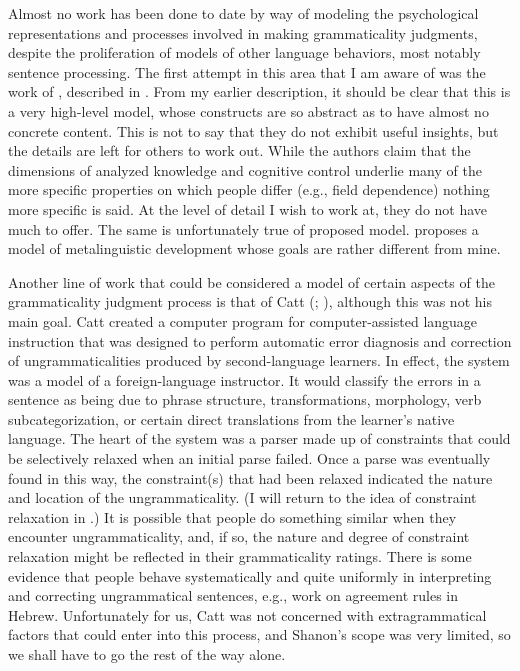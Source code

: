 Almost no work has been done to date by way of modeling the psychological representations and processes involved in making grammaticality judgments, despite the proliferation of models of other language behaviors, most notably sentence processing. The first attempt in this area that I am aware of was the work of \citet{BialystokEtAl1985}, described in . From my earlier description, it should be clear that this is a very high-level model, whose constructs are so abstract as to have almost no concrete content. This is not to say that they do not exhibit useful insights, but the details are left for others to work out. While the authors claim that the dimensions of analyzed knowledge and cognitive control underlie many of the more specific properties on which people differ (e.g., field dependence) nothing more specific is said. At the level of detail I wish to work at, they do not have much to offer. The same is unfortunately true of  proposed model. \citet{Gombert1992} proposes a model of metalinguistic development whose goals are rather different from mine.

Another line of work that could be considered a model of certain aspects of  the grammaticality judgment  process is that of Catt (\citeyear{Catt1988}; \citealt{CattEtAl1990}),\linebreak 
although this was not his main goal. Catt created a computer program for com\-puter-assisted language instruction that was designed to perform automatic error diagnosis and correction of ungrammaticalities produced by second-language learners. In effect, the system was a model of a foreign-language instructor. It would classify the errors in a sentence as being due to phrase structure, transformations, morphology, verb subcategorization, or certain direct translations from the learner's native language. The heart of the system was a parser made up of
constraints that could be selectively relaxed when an initial parse failed. Once a parse was eventually found in this way, the constraint(s) that had been relaxed indicated the nature and location of the ungrammaticality. (I will return to the idea of constraint relaxation in .) It is possible that people do something similar when they encounter ungrammaticality, and, if so, the nature and degree of constraint relaxation might be reflected in their grammaticality ratings. There is some evidence that people behave systematically and quite uniformly in interpreting and correcting ungrammatical sentences, e.g.,  work on agreement rules in Hebrew. Unfortunately for us, Catt was not concerned with extragrammatical factors that could enter into this process, and Shanon's scope was very limited, so we shall have to go the rest of the way alone.

